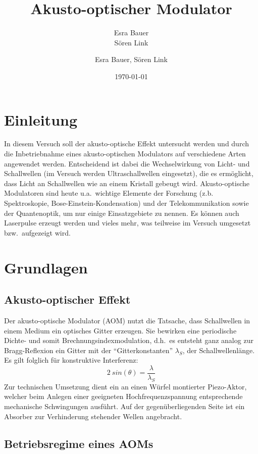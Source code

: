 \documentclass[bigchapter,colorback,accentcolor=tud4b,linedtoc,11pt]{tudreport}
\title{Akusto-optischer Modulator}
\subtitle{Esra Bauer  \\Sören Link}
\author{Esra Bauer, Sören Link}
\date{\today}
\begin{document}

\maketitle

\tableofcontents


\chapter{Einleitung}

In diesem Versuch soll der akusto-optische Effekt untersucht werden und durch die Inbetriebnahme eines akusto-optischen Modulators auf verschiedene Arten angewendet werden. Entscheidend ist dabei die Wechselwirkung von Licht- und Schallwellen (im Versuch werden Ultraschallwellen eingesetzt), die es ermöglicht, dass Licht an Schallwellen wie an einem Kristall gebeugt wird. Akusto-optische Modulatoren sind heute u.a.\ wichtige Elemente der Forschung (z.b. Spektroskopie, Bose-Einstein-Kondensation) und der Telekommunikation sowie der Quantenoptik, um nur einige Einsatzgebiete zu nennen. Es können auch Laserpulse erzeugt werden und vieles mehr, was teilweise im Versuch umgesetzt bzw.\ aufgezeigt wird.

\chapter{Grundlagen}
\section{Akusto-optischer Effekt}

Der akusto-optische Modulator (AOM) nutzt die Tatsache, dass Schallwellen in einem Medium ein optisches Gitter erzeugen. Sie bewirken eine periodische Dichte- und somit Brechnungsindexmodulation, d.h.\ es entsteht ganz analog zur Bragg-Reflexion ein Gitter mit der ``Gitterkonstanten'' $\lambda_S$, der Schallwellenlänge. Es gilt folglich für konstruktive Interferenz: 
$$2~sin(\theta) = \frac{\lambda}{\lambda_S}$$ 
Zur technischen Umsetzung dient ein an einen Würfel montierter Piezo-Aktor, welcher beim Anlegen einer geeigneten Hochfrequenzspannung entsprechende mechanische Schwingungen ausführt. Auf der gegenüberliegenden Seite ist ein Absorber zur Verhinderung stehender Wellen angebracht.

\section{Betriebsregime eines AOMs}
\end{document}
